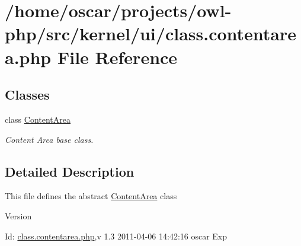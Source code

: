 \section{/home/oscar/projects/owl-\/php/src/kernel/ui/class.contentarea.php File Reference}
\label{class_8contentarea_8php}
\subsection*{Classes}
\begin{DoxyCompactItemize}
\item 
class \hyperlink{classContentArea}{ContentArea}
\begin{DoxyCompactList}\small\item\em Content Area base class. \item\end{DoxyCompactList}\end{DoxyCompactItemize}


\subsection{Detailed Description}
This file defines the abstract \hyperlink{classContentArea}{ContentArea} class \begin{DoxyVersion}{Version}

\end{DoxyVersion}
\begin{DoxyParagraph}{Id:}
\hyperlink{class_8contentarea_8php}{class.contentarea.php},v 1.3 2011-\/04-\/06 14:42:16 oscar Exp 
\end{DoxyParagraph}

